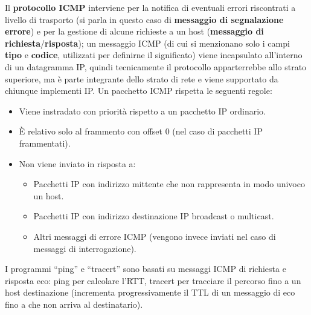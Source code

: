 \documentclass[11pt, italian, openany]{book}
\begin{document}
\begin{sloppypar}
{} \label{Protocollo ICMP}
Il \textbf{protocollo ICMP} interviene per la notifica di eventuali errori riscontrati a livello di trasporto (si parla in questo caso di
\textbf{messaggio di segnalazione errore}) e per la gestione di alcune richieste a un host (\textbf{messaggio di richiesta}/\textbf{risposta}); un messaggio
ICMP (di cui si menzionano solo i campi \textbf{tipo} e \textbf{codice}, utilizzati per definirne il significato) viene incapsulato all'interno di un
datagramma IP, quindi tecnicamente il protocollo apparterrebbe allo strato superiore, ma \`e parte integrante dello strato di rete e viene supportato da
chiunque implementi IP. Un pacchetto ICMP rispetta le seguenti regole:
\begin{itemize}[itemsep=0pt, parsep=0pt, topsep=0pt]
	\item Viene instradato con priorit\`a rispetto a un pacchetto IP ordinario.
	\item \`E relativo solo al frammento con offset 0 (nel caso di pacchetti IP frammentati).
	\item Non viene inviato in risposta a:
	\begin{itemize}
		\item Pacchetti IP con indirizzo mittente che non rappresenta in modo univoco un host.
		\item Pacchetti IP con indirizzo destinazione IP broadcast o multicast.
		\item Altri messaggi di errore ICMP (vengono invece inviati nel caso di messaggi di interrogazione).
	\end{itemize}
\end{itemize}
I programmi ``ping'' e ``tracert'' sono basati su messaggi ICMP di richiesta e risposta eco: ping per calcolare l'RTT, tracert per tracciare il percorso
fino a un host destinazione (incrementa progressivamente il TTL di un messaggio di eco fino a che non arriva al destinatario).


\end{sloppypar}
\end{document}
